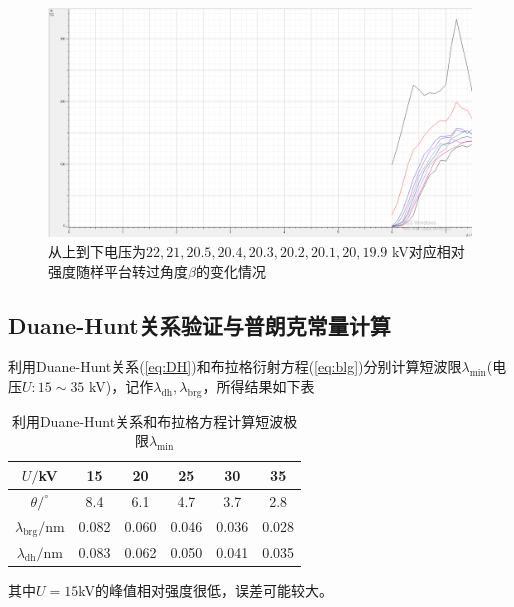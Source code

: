 \documentclass{whureport}
\begin{document}
	\begin{figure}[H]
		\centering
		\includegraphics[scale=0.4]{vth.png}
		\captionsetup{font=footnotesize}
		\caption{从上到下电压为$22,21,20.5,20.4,20.3,20.2,20.1,20,19.9$ kV对应相对强度随样平台转过角度$\beta$的变化情况}
		\label{fig:vth}
	\end{figure}
\begin{multicols}{2}
	\subsection{Duane-Hunt关系验证与普朗克常量计算}
	利用Duane-Hunt关系(\ref{eq:DH})和布拉格衍射方程(\ref{eq:blg})分别计算短波限$\lambda_{\min}$(电压$U:15\sim35$ kV)，记作$\lambda_{\text{dh}},\lambda_{\text{brg}}$，所得结果如下表
	\begin{table}[htbp]
		\centering
		\caption{利用Duane-Hunt关系和布拉格方程计算短波极限$\lambda_{\min}$}
		\begin{tabular}{|c|c|c|c|c|c|}
			\hline
			$U/$kV  & 15    & 20    & 25    & 30    & 35 \bigstrut\\
			\hline
			$\theta/^\circ$     & 8.4   & 6.1   & 4.7   & 3.7   & 2.8 \bigstrut\\
			\hline
			$\lambda_{\text{brg}}/$nm   & 0.082  & 0.060  & 0.046  & 0.036  & 0.028  \bigstrut\\
			\hline
			$\lambda_{\text{dh}}/$nm    & 0.083  & 0.062  & 0.050  & 0.041  & 0.035  \bigstrut\\
			\hline
		\end{tabular}%
	\end{table}%
	其中$U=15 $kV的峰值相对强度很低，误差可能较大。\\
\end{multicols}
\end{document}
